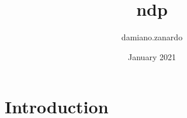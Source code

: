 \documentclass{article}
\title{ndp}
\author{damiano.zanardo }
\date{January 2021}
\begin{document}
\maketitle

\section{Introduction}
\end{document}
